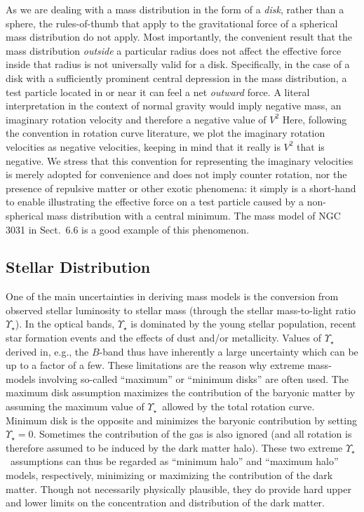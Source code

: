 \documentclass[usenatbib,usegraphicx,apjfonts,floatfix]{emulateapj}
\newcommand{\MLstar}{\ensuremath{\Upsilon_{\star}}}
\begin{document}
As we are dealing with a mass distribution in the form of a
\emph{disk}, rather than a sphere, the rules-of-thumb that apply to
the gravitational force of a spherical mass distribution do not apply.
Most importantly, the convenient result that the mass distribution
\emph{outside} a particular radius does not affect the effective force
inside that radius is not universally valid for a disk.  Specifically,
in the case of a disk with a sufficiently prominent central depression
in the mass distribution, a test particle located in or near it can
feel a net \emph{outward} force. A literal interpretation in the
context of normal gravity would imply negative mass, an imaginary
rotation velocity and therefore a negative value of $V^2$ Here,
following the convention in rotation curve literature, we plot the
imaginary rotation velocities as negative velocities, keeping in
mind that it really is $V^2$ that is
negative.  We stress that this convention for representing the
imaginary velocities is merely adopted for convenience and does not
imply counter rotation, nor the presence of repulsive matter or other
exotic phenomena: it simply is a short-hand to enable illustrating the
effective force on a test particle caused by a non-spherical mass
distribution with a central minimum. The mass model of NGC 3031 in
Sect.~6.6 is a good example of this phenomenon.

\subsection{Stellar Distribution}

One of the main uncertainties in deriving mass models is the
conversion from observed stellar luminosity to stellar mass (through
the stellar mass-to-light ratio $\Upsilon_{\star}$).  In the optical
bands, $\Upsilon_{\star}$ is dominated by the young stellar
population, recent star formation events and the effects of dust and/or
metallicity.  Values of $\Upsilon_{\star}$ derived in, e.g., the
$B$-band thus have inherently a large uncertainty which can be up to a
factor of a few.  These limitations are the reason why extreme
mass-models involving so-called ``maximum'' or ``minimum disks''
\citep{maxdisk86} are often used. The maximum disk assumption
maximizes the contribution of the baryonic matter by assuming the
maximum value of \MLstar\ allowed by the total rotation curve. Minimum
disk is the opposite and minimizes the baryonic contribution by
setting $\MLstar = 0$. Sometimes the contribution of the gas is also
ignored (and all rotation is therefore assumed to be induced by the
dark matter halo). These two extreme \MLstar\ assumptions can thus be
regarded as ``minimum halo'' and ``maximum halo'' models,
respectively, minimizing or maximizing the contribution of the
dark matter. Though not necessarily physically plausible, they do
provide hard upper and lower limits on the concentration and
distribution of the dark matter.
\end{document}

